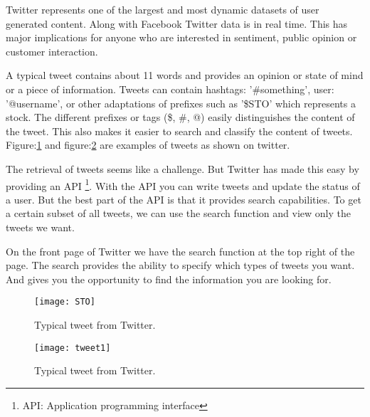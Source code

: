 Twitter represents one of the largest and most dynamic datasets of user
generated content. Along with Facebook Twitter data is in real time. This has major
implications for anyone who are interested in sentiment, public opinion or
customer interaction. \cite[]{sperious11}

A typical tweet contains about 11 words and provides an opinion or state of
mind or a piece of information. Tweets can contain hashtags: '\#something', user:
'@username', or other adaptations of prefixes such as '\$STO' which represents a
stock. The different prefixes or tags (\$, \#, @) easily distinguishes the
content of the tweet. This also makes it easier to search and classify the
content of tweets. Figure:\ref{fig:sto} and figure:\ref{fig:tweet1} are
examples of tweets as shown on twitter.

The retrieval of tweets seems like a challenge. But Twitter has made this easy
by providing an API \footnote{API: Application programming interface}. With the
API you can write tweets and update the status of a user. But the best part of
the API is that it provides search capabilities. To get a certain subset of all
tweets, we can use the search function and view only the tweets we want. 

On the front page of Twitter we have the search function at the top right of
the page. The search provides the ability to specify which types of tweets you
want. And gives you the opportunity to find the information you are looking for. 

\begin{figure}[htb]
    \centering
    \texttt{[image: STO]} 
    \caption{Typical tweet from Twitter.}
    \label{fig:sto}
\end{figure}


\begin{figure}[htb]
    \centering
    \texttt{[image: tweet1]} 
    \caption{Typical tweet from Twitter.}
    \label{fig:tweet1}
\end{figure}

%


